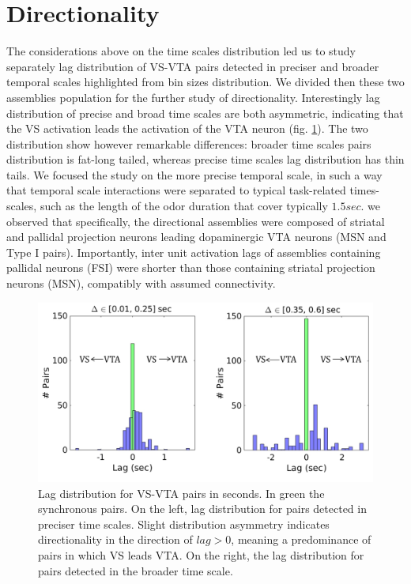 \section{Directionality} 
The considerations above on the time scales distribution led us to study separately lag distribution of VS-VTA pairs detected in preciser and broader temporal scales highlighted from bin sizes distribution. We divided then these two assemblies population for the further study of directionality.
Interestingly lag distribution of precise and broad time scales are both asymmetric, indicating that the VS activation leads the activation of the VTA neuron (fig. \ref{fig:LagInSecAll}). The two distribution show however remarkable differences: broader time scales pairs distribution is fat-long tailed, whereas precise time scales lag distribution has thin tails.
We focused the study on the more precise temporal scale, in such a way that temporal scale interactions were separated to typical task-related times-scales, such as the length of the odor duration that cover typically $1.5 sec$.  we observed that specifically, the directional assemblies were composed of striatal and pallidal projection neurons leading dopaminergic VTA neurons (MSN and Type I pairs). Importantly, inter unit activation lags of assemblies containing pallidal neurons (FSI) were shorter than those containing striatal projection neurons (MSN), compatibly with assumed connectivity.
\begin{figure}[H]
\centering
\includegraphics[scale=0.6]{figures/LagGeneral1.pdf}
\caption{Lag distribution for VS-VTA pairs in seconds. In green the synchronous pairs. On the left, lag distribution for pairs detected in preciser time scales. Slight distribution asymmetry indicates directionality in the direction of $lag > 0$, meaning a predominance of pairs in which VS leads VTA. On the right, the lag distribution for pairs detected in the broader time scale.}
\label{fig:LagInSecAll}
\end{figure}

